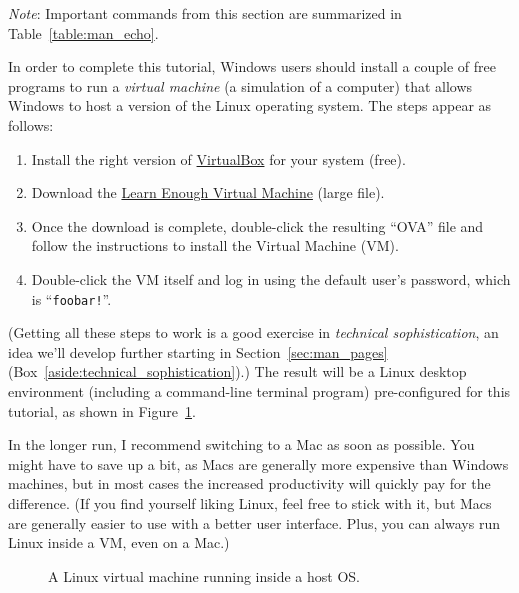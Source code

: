 \emph{Note}: Important commands from this section are summarized in Table~\ref{table:man_echo}.

\begin{aside}
\label{aside:virtual_machine}

In order to complete this tutorial, Windows users should install a couple of free programs to run a \emph{virtual machine} (a simulation of a computer) that allows Windows to host a version of the Linux operating system. The steps appear as follows:

\begin{enumerate}
\item Install the right version of \href{https://www.virtualbox.org/}{VirtualBox} for your system (free).
\item Download the \href{https://softcover-static.s3.amazonaws.com/LearnEnough-v.1.4.ova}{Learn Enough Virtual Machine} (large file).
\item Once the download is complete, double-click the resulting ``OVA'' file and follow the instructions to install the Virtual Machine (VM).
\item Double-click the VM itself and log in using the default user's password, which is ``\texttt{foobar!}''.
\end{enumerate}
(Getting all these steps to work is a good exercise in \emph{technical sophistication}, an idea we'll develop further starting in Section~\ref{sec:man_pages} (Box~\ref{aside:technical_sophistication}).) The result will be a Linux desktop environment (including a command-line terminal program) pre-configured for this tutorial, as shown in Figure~\ref{fig:virtual_machine}.


In the longer run, I recommend switching to a Mac as soon as possible. You might have to save up a bit, as Macs are generally more expensive than Windows machines, but in most cases the increased productivity will quickly pay for the difference. (If you find yourself liking Linux, feel free to stick with it, but Macs are generally easier to use with a better user interface. Plus, you can always run Linux inside a VM, even on a Mac.)
\end{aside}

\begin{figure}
\begin{center}
\end{center}
\caption{A Linux virtual machine running inside a host OS.\label{fig:virtual_machine}}
\end{figure}

